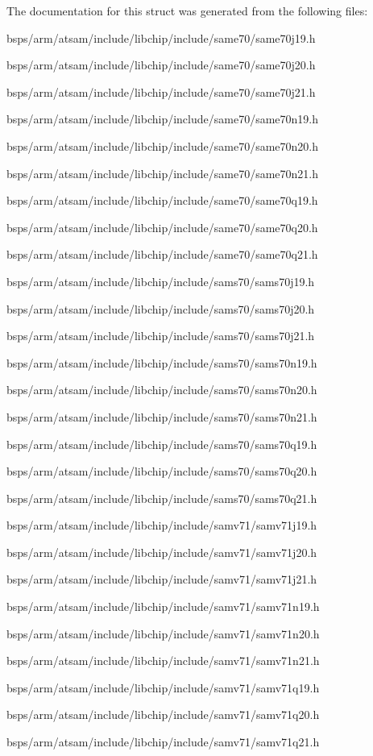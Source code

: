 The documentation for this struct was generated from the following files\+:\begin{DoxyCompactItemize}
\item 
bsps/arm/atsam/include/libchip/include/same70/same70j19.\+h\item 
bsps/arm/atsam/include/libchip/include/same70/same70j20.\+h\item 
bsps/arm/atsam/include/libchip/include/same70/same70j21.\+h\item 
bsps/arm/atsam/include/libchip/include/same70/same70n19.\+h\item 
bsps/arm/atsam/include/libchip/include/same70/same70n20.\+h\item 
bsps/arm/atsam/include/libchip/include/same70/same70n21.\+h\item 
bsps/arm/atsam/include/libchip/include/same70/same70q19.\+h\item 
bsps/arm/atsam/include/libchip/include/same70/same70q20.\+h\item 
bsps/arm/atsam/include/libchip/include/same70/same70q21.\+h\item 
bsps/arm/atsam/include/libchip/include/sams70/sams70j19.\+h\item 
bsps/arm/atsam/include/libchip/include/sams70/sams70j20.\+h\item 
bsps/arm/atsam/include/libchip/include/sams70/sams70j21.\+h\item 
bsps/arm/atsam/include/libchip/include/sams70/sams70n19.\+h\item 
bsps/arm/atsam/include/libchip/include/sams70/sams70n20.\+h\item 
bsps/arm/atsam/include/libchip/include/sams70/sams70n21.\+h\item 
bsps/arm/atsam/include/libchip/include/sams70/sams70q19.\+h\item 
bsps/arm/atsam/include/libchip/include/sams70/sams70q20.\+h\item 
bsps/arm/atsam/include/libchip/include/sams70/sams70q21.\+h\item 
bsps/arm/atsam/include/libchip/include/samv71/samv71j19.\+h\item 
bsps/arm/atsam/include/libchip/include/samv71/samv71j20.\+h\item 
bsps/arm/atsam/include/libchip/include/samv71/samv71j21.\+h\item 
bsps/arm/atsam/include/libchip/include/samv71/samv71n19.\+h\item 
bsps/arm/atsam/include/libchip/include/samv71/samv71n20.\+h\item 
bsps/arm/atsam/include/libchip/include/samv71/samv71n21.\+h\item 
bsps/arm/atsam/include/libchip/include/samv71/samv71q19.\+h\item 
bsps/arm/atsam/include/libchip/include/samv71/samv71q20.\+h\item 
bsps/arm/atsam/include/libchip/include/samv71/samv71q21.\+h\end{DoxyCompactItemize}
